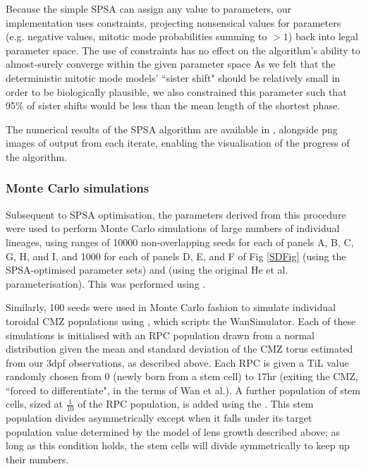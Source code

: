 \documentclass[10pt,letterpaper]{article}
\begin{document}
 Because the simple SPSA can assign any value to parameters, our implementation uses constraints, projecting nonsensical values for parameters (e.g. negative values, mitotic mode probabilities summing to $>1$) back into legal parameter space. The use of constraints has no effect on the algorithm's ability to almost-surely converge within the given parameter space\cite{Sadegh1997} As we felt that the deterministic mitotic mode models' ``sister shift" should be relatively small in order to be biologically plausible, we also constrained this parameter such that 95\% of sister shifts would be less than the mean length of the shortest phase.
 
 The numerical results of the SPSA algorithm are available in , alongside png images of output from each iterate, enabling the visualisation of the progress of the algorithm.
 
\subsubsection*{Monte Carlo simulations}
 Subsequent to SPSA optimisation, the parameters derived from this procedure were used to perform Monte Carlo simulations of large numbers of individual lineages, using ranges of 10000 non-overlapping seeds for each of panels A, B, C, G, H, and I, and 1000 for each of panels D, E, and F of Fig \ref{SDFig} (using the SPSA-optimised parameter sets) and  (using the original He et al. parameterisation). This was performed using .
 
 Similarly, 100 seeds were used in Monte Carlo fashion to simulate individual toroidal CMZ populations using , which scripts the WanSimulator. Each of these simulations is initialised with an RPC population drawn from a normal distribution given the mean and standard deviation of the CMZ torus estimated from our 3dpf observations, as described above. Each RPC is given a TiL value randomly chosen from 0 (newly born from a stem cell) to 17hr (exiting the CMZ, ``forced to differentiate", in the terms of Wan et al.). A further population of stem cells, sized at $\frac{1}{10}$ of the RPC population, is added using the . This stem population divides asymmetrically except when it falls under its target population value determined by the model of lens growth described above; as long as this condition holds, the stem cells will divide symmetrically to keep up their numbers.
 
\end{document}
